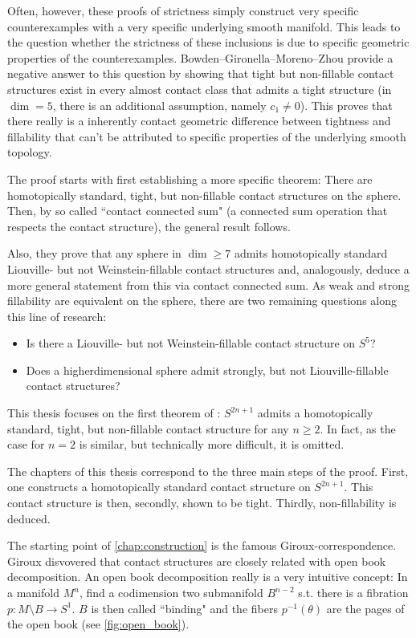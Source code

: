 Often, however, these proofs of strictness simply construct very specific counterexamples with a very specific underlying smooth manifold.
This leads to the question whether the strictness of these inclusions is due to specific geometric properties of the counterexamples.
Bowden--Gironella--Moreno--Zhou \cite{BGMZ22} provide a negative answer to this question by showing that tight but
non-fillable contact structures exist in every almost contact class that admits a tight structure (in $\dim = 5$, there is an additional assumption, namely $c_1\neq 0$).
This proves that there really is a inherently contact geometric difference between tightness and fillability
that can't be attributed to specific properties of the underlying smooth topology.

The proof starts with first establishing a more specific theorem: There are homotopically standard, tight, but non-fillable contact structures on the sphere.
Then, by so called ``contact connected sum" (a connected sum operation that respects the contact structure),
the general result follows.

Also, they prove that any sphere in $\dim \geq 7$ admits homotopically standard Liouville- but not Weinstein-fillable contact structures
and, analogously, deduce a more general statement from this via contact connected sum.
As weak and strong fillability are equivalent on the sphere, there are two remaining questions along this line of research:
\begin{itemize}
    \item Is there a Liouville- but not Weinstein-fillable contact structure on $S^5$?
    \item Does a higherdimensional sphere admit strongly, but not Liouville-fillable contact structures?
\end{itemize}

This thesis focuses on the first theorem of \cite{BGMZ22}: $S^{2n+1}$ admits a homotopically standard, tight, but non-fillable contact structure
for any $n \geq 2$. In fact, as the case for $n = 2$ is similar, but technically more difficult, it is omitted.

The chapters of this thesis correspond to the three main steps of the proof. First, one constructs a homotopically standard contact structure on $S^{2n+1}$.
This contact structure is then, secondly, shown to be tight.
Thirdly, non-fillability is deduced.

The starting point of \cref{chap:construction} is the famous Giroux-correspondence.
Giroux disvovered that contact structures are closely related with open book decomposition.
An open book decomposition really is a very intuitive concept: In a manifold $M^n$, find a codimension two submanifold $B^{n-2}$
s.t. there is a fibration $p\colon M\setminus B \to S^1$. $B$ is then called ``binding" and the fibers $p^{-1}(\theta)$ are the pages of the open book 
(see \cref{fig:open_book}).

